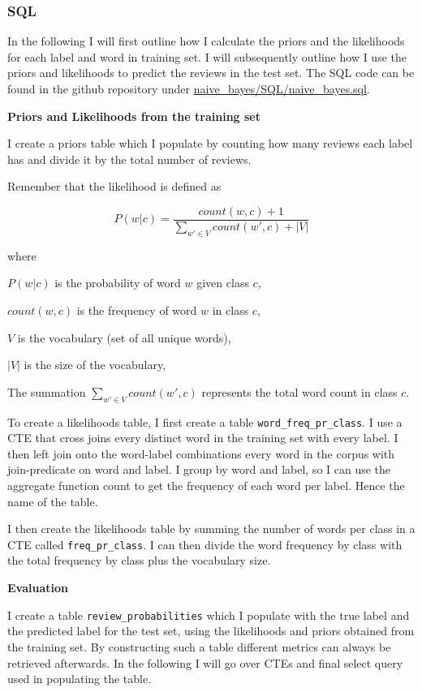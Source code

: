 \documentclass{article}
\begin{document}
\subsubsection{SQL}
In the following I will first outline how I calculate the priors and the likelihoods for each label and word in training set. I will subsequently outline how I use the priors and likelihoods to predict the reviews in the test set. The SQL code can be found in the github repository under \url{naive_bayes/SQL/naive_bayes.sql}.

\medskip\noindent \textbf{Priors and Likelihoods from the training set}

\smallskip \noindent I create a priors table which I populate by counting how many reviews each label has and divide it by the total number of reviews.


\medskip \noindent Remember that the likelihood is defined as 

$$P(w|c) = \frac{count(w,c) + 1}{\sum_{w' \in V} count(w',c) + |V|}$$

\noindent where 

    $P(w|c)$ is the probability of word $w$ given class $c$,

    $count(w,c)$ is the frequency of word $w$ in class $c$,

    $V$ is the vocabulary (set of all unique words),

    $|V|$ is the size of the vocabulary,

    The summation $\sum_{w' \in V} count(w',c)$ represents the total word count in class $c$.


\medskip \noindent To create a likelihoods table, I first create a table \texttt{word\_freq\_pr\_class}. I use a CTE that cross joins every distinct word in the training set with every label. I then left join onto the word-label combinations every word in the corpus with join-predicate on word and label. I group by word and label, so I can use the aggregate function count to get the frequency of each word per label. Hence the name of the table. 

\medskip \noindent I then create the likelihoods table by summing the number of words per class in a CTE called \texttt{freq\_pr\_class}. I can then divide the word frequency by class with the total frequency by class plus the vocabulary size. 

\medskip\noindent \textbf{Evaluation}

\smallskip \noindent I create a table \texttt{review\_probabilities} which I populate with the true label and the predicted label for the test set, using the likelihoods and priors obtained from the training set. By constructing such a table different metrics can always be retrieved afterwards. In the following I will go over CTEs and final select query used in populating the table. 
\end{document}
